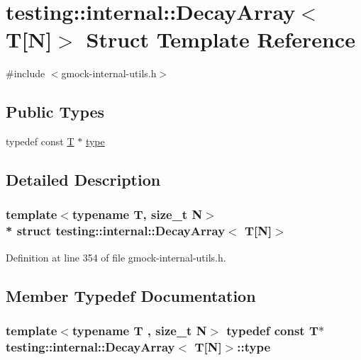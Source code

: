 \hypertarget{structtesting_1_1internal_1_1_decay_array_3_01_t[_n]_4}{}\section{testing\+:\+:internal\+:\+:Decay\+Array$<$ T\mbox{[}N\mbox{]}$>$ Struct Template Reference}
\label{structtesting_1_1internal_1_1_decay_array_3_01_t[_n]_4}


{\ttfamily \#include $<$gmock-\/internal-\/utils.\+h$>$}

\subsection*{Public Types}
\begin{DoxyCompactItemize}
\item 
typedef const \hyperlink{functions__7_8js_adf1f3edb9115acb0a1e04209b7a9937b}{T} $\ast$ \hyperlink{structtesting_1_1internal_1_1_decay_array_3_01_t[_n]_4_afc22a88da484b94639501c07fb90bfd3}{type}
\end{DoxyCompactItemize}


\subsection{Detailed Description}
\subsubsection*{template$<$typename T, size\+\_\+t N$>$\\*
struct testing\+::internal\+::\+Decay\+Array$<$ T\mbox{[}\+N\mbox{]}$>$}



Definition at line 354 of file gmock-\/internal-\/utils.\+h.



\subsection{Member Typedef Documentation}
\subsubsection[{\texorpdfstring{type}{type}}]{\setlength{\rightskip}{0pt plus 5cm}template$<$typename T , size\+\_\+t N$>$ typedef const {\bf T}$\ast$ {\bf testing\+::internal\+::\+Decay\+Array}$<$ {\bf T}\mbox{[}N\mbox{]}$>$\+::{\bf type}}\hypertarget{structtesting_1_1internal_1_1_decay_array_3_01_t[_n]_4_afc22a88da484b94639501c07fb90bfd3}{}\label{structtesting_1_1internal_1_1_decay_array_3_01_t[_n]_4_afc22a88da484b94639501c07fb90bfd3}


